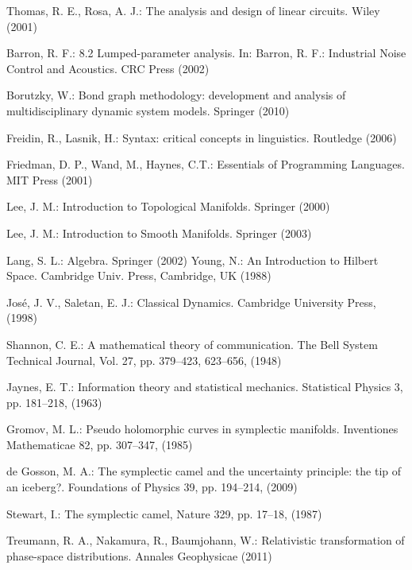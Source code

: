 \documentclass[smallextended]{svjour3}
\numberwithin{equation}{section}
\begin{document}
\begin{thebibliography}{0}
Thomas, R. E., Rosa, A. J.: The analysis and design of linear circuits. Wiley (2001) 

 Barron, R. F.: 8.2 Lumped-parameter analysis. In: Barron, R. F.: Industrial Noise Control and Acoustics. CRC Press (2002)

 Borutzky, W.: Bond graph methodology: development and analysis of multidisciplinary dynamic system models.
Springer (2010) 

 Freidin, R., Lasnik, H.: Syntax: critical concepts in linguistics. Routledge (2006) 

 Friedman, D. P., Wand, M., Haynes, C.T.: Essentials of Programming Languages. MIT Press (2001)

 Lee, J. M.: Introduction to Topological Manifolds. Springer (2000)

 Lee, J. M.: Introduction to Smooth Manifolds. Springer (2003)

 Lang, S. L.: Algebra. Springer (2002)
 Young, N.: An Introduction to Hilbert Space. Cambridge Univ. Press, Cambridge, UK (1988)

 Jos\'{e}, J. V., Saletan, E. J.: Classical Dynamics. Cambridge University Press, (1998)

 Shannon, C. E.: A mathematical theory of communication. The Bell System Technical Journal, Vol. 27, pp. 379--423, 623--656, (1948)

 Jaynes, E. T.: Information theory and statistical mechanics. Statistical Physics 3, pp. 181--218, (1963)

 Gromov, M. L.: Pseudo holomorphic curves in symplectic manifolds. Inventiones Mathematicae 82, pp. 307--347, (1985)

 de Gosson, M. A.: The symplectic camel and the uncertainty principle: the tip of an iceberg?. Foundations of Physics 39, pp. 194--214, (2009)

 Stewart, I.: The symplectic camel, Nature 329, pp. 17--18, (1987)

 Treumann, R. A., Nakamura, R., Baumjohann,  W.: Relativistic transformation of phase-space distributions. Annales Geophysicae (2011)


\end{thebibliography}
\end{document}
